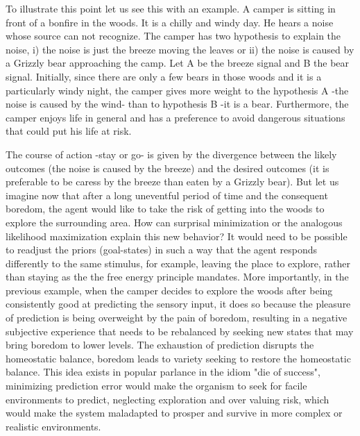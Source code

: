 \documentclass[11pt, onecolumn]{article}
\begin{document}
To illustrate this point let us see this with an example. A camper is sitting in front of a bonfire in the woods. It is a chilly and windy day. He hears a noise whose source can not recognize. The camper has two hypothesis to explain the noise, i) the noise is just the breeze moving the leaves or ii) the noise is caused by a Grizzly bear approaching the camp. Let A be the breeze signal and B the bear signal. Initially, since there are only a few bears in those woods and it is a particularly windy night, the camper gives more weight to the hypothesis A -the noise is caused by the wind- than to hypothesis B -it is a bear. Furthermore, the camper enjoys life in general and has a preference to avoid dangerous situations that could put his life at risk.  

The course of action -stay or go- is given by the divergence between the likely outcomes (the noise is caused by the breeze) and the desired outcomes (it is preferable to be caress by the breeze than eaten by a Grizzly bear). But let us imagine now that after a long uneventful period of time and the consequent boredom, the agent would like to take the risk of getting into the woods to explore the surrounding area. 
How can surprisal minimization or the analogous likelihood maximization explain this new behavior? It would need to be possible to readjust the priors (goal-states) in such a way that the agent responds differently to the same stimulus, for example, leaving the place to explore, rather than staying as the the free energy principle mandates. 
More importantly, in the previous example, when the camper decides to explore the woods after being consistently good at predicting the sensory input, it does so because the pleasure of prediction is being overweight by the pain of boredom, resulting in a negative subjective experience that needs to be rebalanced by seeking new states that may bring boredom to lower levels. 
The exhaustion of prediction disrupts the homeostatic balance, boredom leads to variety seeking to restore the homeostatic balance. This idea exists in popular parlance in the idiom "die of success", minimizing prediction error would make the organism to seek for facile environments to predict, neglecting exploration and over valuing risk, which would make the system maladapted to prosper and survive in more complex or realistic environments. 
\end{document}
